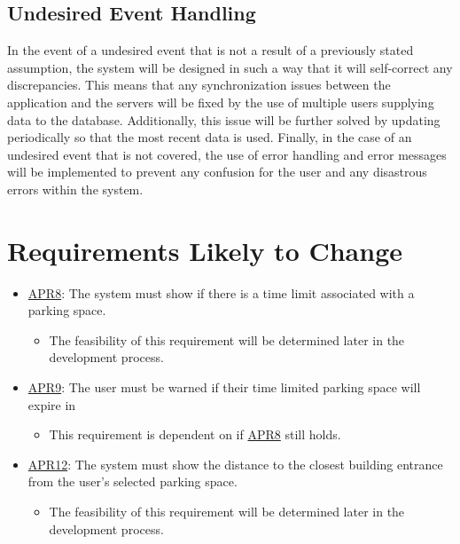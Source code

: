 \documentclass[]{article}
\begin{document}
\subsection{Undesired Event Handling}
In the event of a undesired event that is not a result of a previously stated assumption, the system will be designed in such a way that it will self-correct any discrepancies. This means that any synchronization issues between the application and the servers will be fixed by the use of multiple users supplying data to the database. Additionally, this issue will be further solved by updating periodically so that the most recent data is used. Finally, in the case of an undesired event that is not covered, the use of error handling and error messages will be implemented to prevent any confusion for the user and any disastrous errors within the system. 

\section{Requirements Likely to Change}
\begin{itemize}
    \item \hyperlink{APR8}{APR8}: The system must show if there is a time limit associated with a parking space.
    \begin{itemize}\item The feasibility of this requirement will be determined later in the development process.\end{itemize}
    \item \hyperlink{APR9}{APR9}: The user must be warned if their time limited parking space will expire in
    \begin{itemize}
        \item This requirement is dependent on if \hyperlink{APR8}{APR8} still holds.
    \end{itemize}
    \item \hyperlink{APR12}{APR12}: The system must show the distance to the closest building entrance from the user’s selected parking space.
    \begin{itemize}
        \item The feasibility of this requirement will be determined later in the development process.
    \end{itemize}
\end{itemize}
\end{document}
